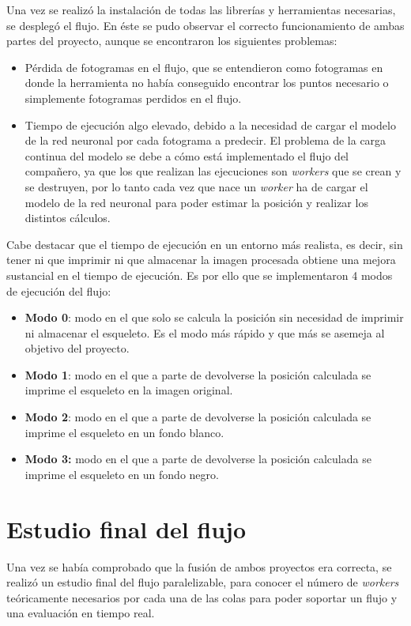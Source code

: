 {Una vez se realizó la instalación de todas las librerías y herramientas necesarias, se desplegó el flujo. En éste se pudo observar el correcto funcionamiento de ambas partes del proyecto, aunque se encontraron los siguientes problemas:
\begin{itemize}
	\item Pérdida de fotogramas en el flujo, que se entendieron como fotogramas en donde la herramienta no había conseguido encontrar los puntos necesario o simplemente fotogramas perdidos en el flujo.
	\item Tiempo de ejecución algo elevado, debido a la necesidad de cargar el modelo de la red neuronal por cada fotograma a predecir. El problema de la carga continua del modelo se debe a cómo está implementado el flujo del compañero, ya que los que realizan las ejecuciones son \textit{workers} que se crean y se destruyen, por lo tanto cada vez que nace un \textit{worker} ha de cargar el modelo de la red neuronal para poder estimar la posición y realizar los distintos cálculos.
\end{itemize}

Cabe destacar que el tiempo de ejecución en un entorno más realista, es decir, sin tener ni que imprimir ni que almacenar la imagen procesada obtiene una mejora sustancial en el tiempo de ejecución. Es por ello que se implementaron 4 modos de ejecución del flujo:
\begin{itemize}
	\item \textbf{Modo 0}: modo en el que solo se calcula la posición sin necesidad de imprimir ni almacenar el esqueleto. Es el modo más rápido y que más se asemeja al objetivo del proyecto.
	\item \textbf{Modo 1}: modo en el que a parte de devolverse la posición calculada se imprime el esqueleto en la imagen original.
	\item \textbf{Modo 2}: modo en el que a parte de devolverse la posición calculada se imprime el esqueleto en un fondo blanco.
	\item \textbf{Modo 3:} modo en el que a parte de devolverse la posición calculada se imprime el esqueleto en un fondo negro.
\end{itemize}

\section{Estudio final del flujo}
Una vez se había comprobado que la fusión de ambos proyectos era correcta, se realizó un estudio final del flujo paralelizable, para conocer el número de \textit{workers} teóricamente necesarios por cada una de las colas para poder soportar un flujo y una evaluación en tiempo real.

}
